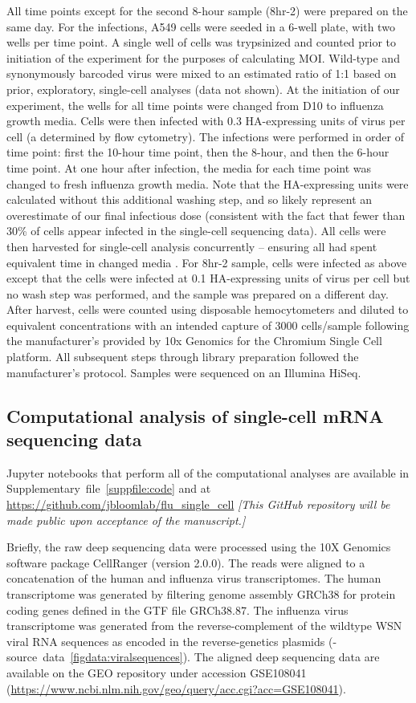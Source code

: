 \documentclass[9pt,lineno]{elife}
\newcommand{\jdbcomment}[1]{\emph{\color{red} [#1]}}
\begin{document}
All time points except for the second 8-hour sample (8hr-2) were prepared on the same day.
For the infections, A549 cells were seeded in a 6-well plate, with two wells per time point. 
A single well of cells was trypsinized and counted prior to initiation of the experiment for the purposes of calculating MOI.
Wild-type and synonymously barcoded virus were mixed to an estimated ratio of 1:1 based on prior, exploratory, single-cell analyses (data not shown). 
At the initiation of our experiment, the wells for all time points were changed from D10 to influenza growth media.
Cells were then infected with 0.3 HA-expressing units of virus per cell (a determined by flow cytometry).
The infections were performed in order of time point: first the 10-hour time point, then the 8-hour, and then the 6-hour time point.
At one hour after infection, the media for each time point was changed to fresh influenza growth media.
Note that the HA-expressing units were calculated without this additional washing step, and so likely represent an overestimate of our final infectious dose (consistent with the fact that fewer than 30\% of cells appear infected in the single-cell sequencing data).
All cells were then harvested for single-cell analysis concurrently -- ensuring all had spent equivalent time in changed media .
For 8hr-2 sample, cells were infected as above except that the cells were infected at 0.1 HA-expressing units of virus per cell but no wash step was performed, and the sample was prepared on a different day.
After harvest, cells were counted using disposable hemocytometers and diluted to equivalent concentrations with an intended capture of 3000 cells/sample following the manufacturer's provided by 10x Genomics for the Chromium Single Cell platform.
All subsequent steps through library preparation followed the manufacturer's protocol.
Samples were sequenced on an Illumina HiSeq. 

\subsection{Computational analysis of single-cell mRNA sequencing data}
Jupyter notebooks that perform all of the computational analyses are available in Supplementary~file~\ref{suppfile:code} and at \url{https://github.com/jbloomlab/flu_single_cell} \jdbcomment{This GitHub repository will be made public upon acceptance of the manuscript.}

Briefly, the raw deep sequencing data were processed using the 10X Genomics software package CellRanger (version 2.0.0).
The reads were aligned to a concatenation of the human and influenza virus transcriptomes.
The human transcriptome was generated by filtering genome assembly GRCh38 for protein coding genes defined in the GTF file GRCh38.87.
The influenza virus transcriptome was generated from the reverse-complement of the wildtype WSN viral RNA sequences as encoded in the reverse-genetics plasmids (-source~data~\ref{figdata:viralsequences}).
The aligned deep sequencing data are available on the GEO repository under accession GSE108041 (\url{https://www.ncbi.nlm.nih.gov/geo/query/acc.cgi?acc=GSE108041}).
\end{document}
